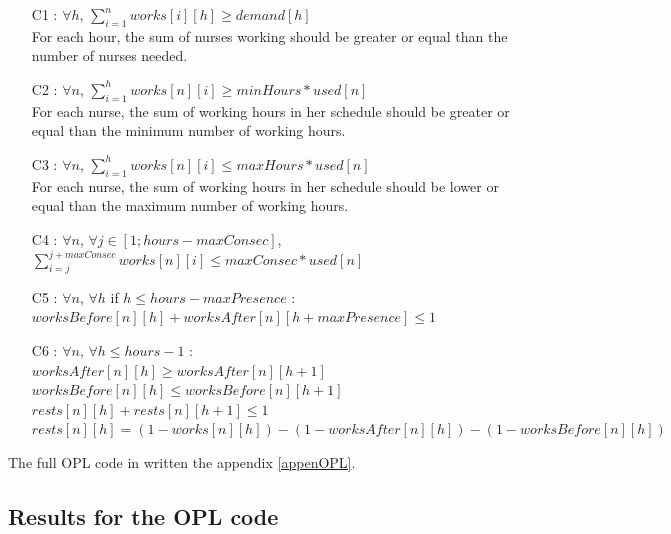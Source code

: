 \documentclass[11pt]{article}
\begin{document}
\begin{itemize}
\item[C1 :] $\forall h$,  $\displaystyle{\sum_{i=1}^{n} }works[i][h] \geq demand[h]$ \\
For each hour, the sum of nurses working should be greater or equal than the number of nurses needed.    
\item[C2 :] $\forall n$,  $\displaystyle{\sum_{i=1}^{h}} works[n][i] \geq minHours*used[n]$\\
For each nurse, the sum of working hours in her schedule should be greater or equal than the minimum number of working hours.
\item[C3 :] $\forall n$,  $\displaystyle{\sum_{i=1}^{h}} works[n][i] \leq maxHours*used[n]$ \\
For each nurse, the sum of working hours in her schedule should be lower or equal than the maximum number of working hours.
\item[C4 :] $\forall n$, $\forall j\in[1; hours-maxConsec]$, $\displaystyle{\sum_{i=j}^{j+maxConsec}} works[n][i] \leq maxConsec*used[n]$ 
\item[C5 :] $\forall n$, $\forall h$ if $h \leq hours-maxPresence$ :\\$worksBefore[n][h]+worksAfter[n][h+maxPresence] \leq 1$
\item[C6 :] $\forall n$, $\forall h\leq hours-1$ : \\$worksAfter[n][h] \geq worksAfter[n][h+1]$\\$worksBefore[n][h] \leq worksBefore[n][h+1]$\\$rests[n][h]+rests[n][h+1]\leq 1$\\$rests[n][h] = (1-works[n][h]) - (1-worksAfter[n][h]) - (1-worksBefore[n][h])$ \\
\end{itemize}

\noindent
The full  OPL code in written the appendix \ref{appenOPL}.

\subsection{Results for the OPL code}





\pagebreak

\end{document}
